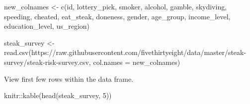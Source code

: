 \documentclass[
]{article}
\newenvironment{Shaded}{\begin{snugshade}}{\end{snugshade}}
\newcommand{\AttributeTok}[1]{\textcolor[rgb]{0.77,0.63,0.00}{#1}}
\newcommand{\DecValTok}[1]{\textcolor[rgb]{0.00,0.00,0.81}{#1}}
\newcommand{\FunctionTok}[1]{\textcolor[rgb]{0.00,0.00,0.00}{#1}}
\newcommand{\NormalTok}[1]{#1}
\newcommand{\OtherTok}[1]{\textcolor[rgb]{0.56,0.35,0.01}{#1}}
\newcommand{\SpecialCharTok}[1]{\textcolor[rgb]{0.00,0.00,0.00}{#1}}
\newcommand{\StringTok}[1]{\textcolor[rgb]{0.31,0.60,0.02}{#1}}
\begin{document}
\begin{Shaded}
\begin{Highlighting}[]
\NormalTok{new\_colnames }\OtherTok{\textless{}{-}} \FunctionTok{c}\NormalTok{(}\StringTok{\textquotesingle{}id\textquotesingle{}}\NormalTok{, }\StringTok{\textquotesingle{}lottery\_pick\textquotesingle{}}\NormalTok{, }\StringTok{\textquotesingle{}smoker\textquotesingle{}}\NormalTok{, }\StringTok{\textquotesingle{}alcohol\textquotesingle{}}\NormalTok{, }\StringTok{\textquotesingle{}gamble\textquotesingle{}}\NormalTok{, }\StringTok{\textquotesingle{}skydiving\textquotesingle{}}\NormalTok{, }\StringTok{\textquotesingle{}speeding\textquotesingle{}}\NormalTok{, }\StringTok{\textquotesingle{}cheated\textquotesingle{}}\NormalTok{, }\StringTok{\textquotesingle{}eat\_steak\textquotesingle{}}\NormalTok{, }\StringTok{\textquotesingle{}doneness\textquotesingle{}}\NormalTok{, }\StringTok{\textquotesingle{}gender\textquotesingle{}}\NormalTok{, }\StringTok{\textquotesingle{}age\_group\textquotesingle{}}\NormalTok{, }\StringTok{\textquotesingle{}income\_level\textquotesingle{}}\NormalTok{, }\StringTok{\textquotesingle{}education\_level\textquotesingle{}}\NormalTok{, }\StringTok{\textquotesingle{}us\_region\textquotesingle{}}\NormalTok{)}

\NormalTok{steak\_survey }\OtherTok{\textless{}{-}} \FunctionTok{read.csv}\NormalTok{(}\StringTok{\textquotesingle{}https://raw.githubusercontent.com/fivethirtyeight/data/master/steak{-}survey/steak{-}risk{-}survey.csv\textquotesingle{}}\NormalTok{, }\AttributeTok{col.names =}\NormalTok{ new\_colnames)}
\end{Highlighting}
\end{Shaded}

View first few rows within the data frame.

\begin{Shaded}
\begin{Highlighting}[]
\NormalTok{knitr}\SpecialCharTok{::}\FunctionTok{kable}\NormalTok{(}\FunctionTok{head}\NormalTok{(steak\_survey, }\DecValTok{5}\NormalTok{))}
\end{Highlighting}
\end{Shaded}
\end{document}
